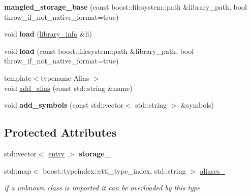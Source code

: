 \begin{DoxyCompactItemize}
\item 
{\bfseries mangled\+\_\+storage\+\_\+base} (const boost\+::filesystem\+::path \&library\+\_\+path, bool throw\+\_\+if\+\_\+not\+\_\+native\+\_\+format=true)\hypertarget{a00213_a90870b467978e20df37c2babfe0a3c13}{}\label{a00213_a90870b467978e20df37c2babfe0a3c13}

\item 
void {\bfseries load} (\hyperlink{a00192}{library\+\_\+info} \&li)\hypertarget{a00213_aa58fda526223482db4b592f8b868bbda}{}\label{a00213_aa58fda526223482db4b592f8b868bbda}

\item 
void {\bfseries load} (const boost\+::filesystem\+::path \&library\+\_\+path, bool throw\+\_\+if\+\_\+not\+\_\+native\+\_\+format=true)\hypertarget{a00213_a2ef7fb1ad3a8c5acb5eb8c27f387e629}{}\label{a00213_a2ef7fb1ad3a8c5acb5eb8c27f387e629}

\item 
{\footnotesize template$<$typename Alias $>$ }\\void \hyperlink{a00213_a34c6f14f96aef274e79f28dd4e1a10b2}{add\+\_\+alias} (const std\+::string \&name)
\item 
void {\bfseries add\+\_\+symbols} (const std\+::vector$<$ std\+::string $>$ \&symbols)\hypertarget{a00213_aecaea85b820805bcf0854edd632496a6}{}\label{a00213_aecaea85b820805bcf0854edd632496a6}

\end{DoxyCompactItemize}
\subsection*{Protected Attributes}
\begin{DoxyCompactItemize}
\item 
std\+::vector$<$ \hyperlink{a00097}{entry} $>$ {\bfseries storage\+\_\+}\hypertarget{a00213_a9d0573d5f1ac601b74fbbf50c374b7ac}{}\label{a00213_a9d0573d5f1ac601b74fbbf50c374b7ac}

\item 
std\+::map$<$ boost\+::typeindex\+::ctti\+\_\+type\+\_\+index, std\+::string $>$ \hyperlink{a00213_a44440237a11d43b33ab3e678480bfb8e}{aliases\+\_\+}\hypertarget{a00213_a44440237a11d43b33ab3e678480bfb8e}{}\label{a00213_a44440237a11d43b33ab3e678480bfb8e}

\begin{DoxyCompactList}\small\item\em if a unknown class is imported it can be overloaded by this type \end{DoxyCompactList}\end{DoxyCompactItemize}


